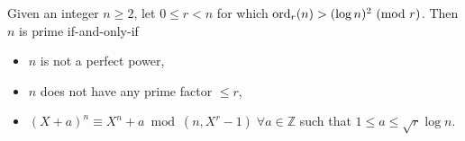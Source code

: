 \documentclass[../main.tex]{subfiles}
\begin{document}
\begin{theorem} \label{aks}

Given an integer $n \geq 2$, let $0 \leq r < n$ for which $\mbox{ord}_{r}(n) > (\log{n})^{2} \ (\mathrm{mod}\ r)$. Then $n$ is prime if-and-only-if
\begin{itemize}
 \item $n$ is not a perfect power,
 \item $n$ does not have any prime factor $\leq r$,
 \item $(X + a)^{n} \equiv X^{n} + a \bmod (n, X^{r} - 1)\; \forall a \in \mathbb{Z}$ such that $1 \leq a \leq \sqrt{r} \log{n}$.
\end{itemize}
\end{theorem}
\end{document}
